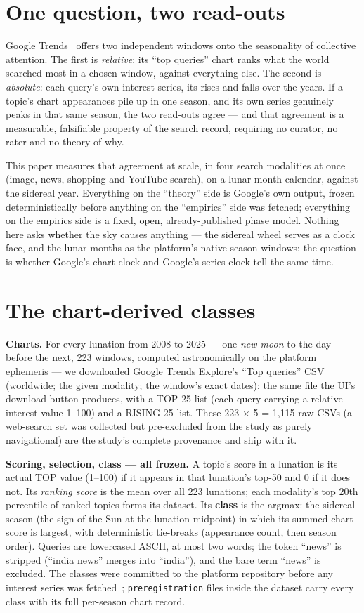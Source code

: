 \documentclass[11pt]{artaquest}
\begin{document}
\section{One question, two read-outs}
Google Trends~\citep{ginsberg2009,choi2012,preis2013} offers two independent windows onto the seasonality of collective attention. The first is \emph{relative}: its ``top queries'' chart ranks what the world searched most in a chosen window, against everything else. The second is \emph{absolute}: each query's own interest series, its rises and falls over the years. If a topic's chart appearances pile up in one season, and its own series genuinely peaks in that same season, the two read-outs agree --- and that agreement is a measurable, falsifiable property of the search record, requiring no curator, no rater and no theory of why.

This paper measures that agreement at scale, in four search modalities at once (image, news, shopping and YouTube search), on a lunar-month calendar, against the sidereal year. Everything on the ``theory'' side is Google's own output, frozen deterministically before anything on the ``empirics'' side was fetched; everything on the empirics side is a fixed, open, already-published phase model. Nothing here asks whether the sky causes anything --- the sidereal wheel serves as a clock face, and the lunar months as the platform's native season windows; the question is whether Google's chart clock and Google's series clock tell the same time.

\section{The chart-derived classes}
\textbf{Charts.} For every lunation from 2008 to 2025 --- one \emph{new moon} to the day before the next, 223 windows, computed astronomically on the platform ephemeris --- we downloaded Google Trends Explore's ``Top queries'' CSV (worldwide; the given modality; the window's exact dates): the same file the UI's download button produces, with a TOP-25 list (each query carrying a relative interest value 1--100) and a RISING-25 list. These 223 $\times$ 5 = 1{,}115 raw CSVs (a web-search set was collected but pre-excluded from the study as purely navigational) are the study's complete provenance and ship with it.

\textbf{Scoring, selection, class --- all frozen.} A topic's score in a lunation is its actual TOP value (1--100) if it appears in that lunation's top-50 and 0 if it does not. Its \emph{ranking score} is the mean over all 223 lunations; each modality's top 20th percentile of ranked topics forms its dataset. Its \textbf{class} is the argmax: the sidereal season (the sign of the Sun at the lunation midpoint) in which its summed chart score is largest, with deterministic tie-breaks (appearance count, then season order). Queries are lowercased ASCII, at most two words; the token ``news'' is stripped (``india news'' merges into ``india''), and the bare term ``news'' is excluded. The classes were committed to the platform repository before any interest series was fetched~\citep{nosek2018}; \texttt{preregistration} files inside the dataset carry every class with its full per-season chart record.
\end{document}
